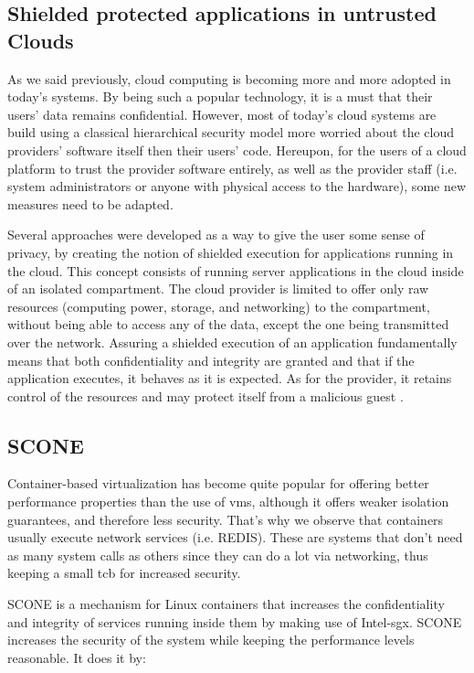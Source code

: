\subsection{Shielded protected applications in untrusted Clouds}
\label{ssec:shieldedApps}

As we said previously, cloud computing is becoming more and more adopted in today's systems. 
By being such a popular technology, it is a must that their users' data remains confidential. 
However, most of today's cloud systems are build using a classical hierarchical security model more worried about the cloud providers' software itself then their users' code. 
Hereupon, for the users of a cloud platform to trust the provider software entirely, as well as the provider staff (i.e. system administrators or anyone with physical access to the hardware), some new measures need to be adapted.

Several approaches were developed as a way to give the user some sense of privacy, by creating the notion of shielded execution for applications running in the cloud. 
This concept consists of running server applications in the cloud inside of an isolated compartment. The cloud provider is limited to offer only raw resources (computing power, storage, and networking) to the compartment, without being able to access any of the  data, except the one being transmitted over the network. 
Assuring a shielded execution of an application fundamentally means that both confidentiality and integrity are granted and that if the application executes, it behaves as it is expected. As for the provider, it retains control of the resources and may protect itself from a malicious guest \cite{havenPaper}. 


\subsection{SCONE}
\label{ssec:scone}

Container-based virtualization has become quite popular for offering better performance properties than the use of \gls{vm}s, although it offers weaker isolation guarantees, and therefore less security. 
That's why we observe that containers usually execute network services (i.e. REDIS). These are systems that don't need as many system calls as others since they can do a lot via networking, thus keeping a small \gls{tcb} for increased security.

SCONE \cite{sconePaper} is a mechanism for Linux containers that increases the confidentiality and integrity of services running inside them by making use of Intel-\gls{sgx}.
SCONE increases the security of the system while keeping the performance levels reasonable. 
It does it by: 

